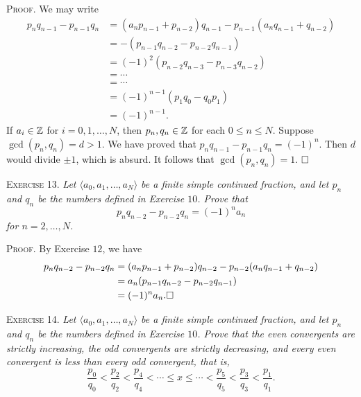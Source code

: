 \documentclass[11pt, leqno]{article}
\newcommand{\done}{\ensuremath{\hfill\square}}
\begin{document}
\textsc{Proof}. We may write 
\begin{align*}
  p_nq_{n-1} - p_{n-1}q_n &= (a_np_{n-1} + p_{n-2})q_{n-1} - p_{n-1}(a_nq_{n-1}+q_{n-2}) \\
                          &= -(p_{n-1}q_{n-2} - p_{n-2}q_{n-1}) \\
                          &= (-1)^2 (p_{n-2}q_{n-3} - p_{n-3}q_{n-2}) \\
                          &= \cdots \\
                          &= \cdots \\
                          &= (-1)^{n-1} (p_1q_0 - q_0p_1) \\
                          &= (-1)^{n-1}.
\end{align*}
If $a_i \in \mathbb{Z}$ for $i = 0, 1, \ldots, N$, then $p_n, q_n \in \mathbb{Z}$ for each $0 \leq n \leq N$. Suppose $\gcd(p_n, q_n) = d > 1$. We have proved that $p_nq_{n-1} - p_{n-1}q_n = (-1)^n$.  Then $d$ would divide $\pm 1$, which is absurd. It follows that $\gcd(p_n, q_n) = 1$. \done

\textsc{Exercise 13}. \emph{Let $\langle a_0, a_1, \ldots, a_N\rangle$ be a finite simple continued fraction, and let $p_n$ and $q_n$ be the numbers defined in Exercise $10$. Prove that 
\begin{displaymath}
p_nq_{n-2} - p_{n-2}q_n = (-1)^n a_n
\end{displaymath}for $n=2,\ldots, N$.}

\textsc{Proof}. By Exercise $12$, we have 
\begin{align*}
  p_nq_{n-2} - p_{n-2}q_n &= (a_np_{n-1}+ p_{n-2})q_{n-2} - p_{n-2}(a_nq_{n-1} + q_{n-2}) \\
                          &= a_n(p_{n-1}q_{n-2} - p_{n-2}q_{n-1})\\
  &= (-1)^n a_n. \done
\end{align*}

\textsc{Exercise 14}. \emph{Let $\langle a_0, a_1, \ldots, a_N\rangle$ be a finite simple continued fraction, and let $p_n$ and $q_n$ be the numbers defined in Exercise $10$. Prove that the even convergents are strictly increasing, the odd convergents are strictly decreasing, and every even convergent is less than every odd convergent, that is, 
\begin{displaymath}
\frac{p_0}{q_0} < \frac{p_2}{q_2} < \frac{p_4}{q_4} < \cdots \leq x \leq \cdots < \frac{p_5}{q_5} < \frac{p_3}{q_3} < \frac{p_1}{q_1}.
\end{displaymath}}
\end{document}
